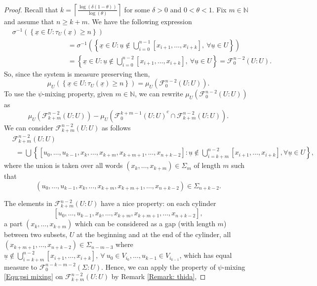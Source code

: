 \documentclass[11pt, reqno]{amsart}
\theoremstyle{plain}%
\theoremstyle{definition}
\theoremstyle{definition}
\def\N{\ensuremath{\mathbb N}}
\def\F{\ensuremath{\mathcal F}}
\def\ulx{\underline{x}}
\def\ulu{\underline{u}}
\numberwithin{equation}{section}
\begin{document}
\begin{proof}
Recall that $k=\left\lceil \frac{\log(\delta(1-\theta))}{\log(\theta)}\right\rceil$ for some $\delta>0$ and $0<\theta<1$. Fix $m\in \N $ and assume that $n\ge k+m$. We have the following expression
\begin{align*}
&\sigma^{-1}\left(\left\{\ulx\in U: \tau_U(\ulx)\ge n\right\}\right)\\&\quad\qquad\quad \qquad\qquad= \sigma^{-1}\left(\left\{ \ulx\in U: \ulu\notin \bigcup_{i=0}^{n-1} [x_{i+1},\ldots,x_{i+k}],\ \forall \ulu\in U \right\}\right) \\&\quad\qquad\quad \qquad\qquad= \left\{ \ulx\in U: \ulu\notin \bigcup_{i=0}^{n-2} [x_{i+1},\ldots,x_{i+k}],\ \forall \ulu\in U \right\} = \F_0^{n-2}(U:U).\end{align*} 
So, since the system is measure preserving then,
\begin{equation} 
\label{Eq: Same measure for sigma inverse}
\mu_U \left(\left\{\ulx\in U: \tau_U(\ulx)\ge n \right\}\right)=\mu_U\left(\F_0^{n-2}(U:U)\right). 
\end{equation}
To use the $\psi$-mixing property, given $m\in\N$, we can rewrite $\mu_U\left(\F_0^{n-2} (U:U)\right)$ as 
\begin{equation}
\mu_U\left(\F_{k+m}^{n-2}(U:U)\right)  -\mu_U\left( {\F_0^{k+m-1}(U:U)}^c\cap \F_{k+m}^{n-2}(U:U) \right).\label{Terms I&II}\end{equation}
We can consider $\F_{k+m}^{n-2}(U:U)$ as follows
\begin{align*}
    &\F_{k+m}^{n-2}(U:U)\\&\ \ = \bigcup\left\{[u_0,\ldots,u_{k-1},x_k,\ldots,x_{k+m},x_{k+m+1},\ldots,x_{n+k-2}]:\ulu\notin \bigcup_{i=k+m}^{n-2} [x_{i+1},\ldots,x_{i+k}], \forall \ulu\in U\right\},
\end{align*}
where the union is taken over all words $(x_k,\ldots,x_{k+m})\in\Sigma_m$ of length $m$ such that $$(u_0,\ldots,u_{k-1},x_k,\ldots,x_{k+m},x_{k+m+1},\ldots,x_{n+k-2})\in\Sigma_{n+k-2}.$$ 

The elements in ${\F_{k+m}^{n-2}(U:U)} $ have a nice property: on each cylinder $$[u_0,\ldots,u_{k-1},x_k,\ldots,x_{k+m},x_{k+m+1},\ldots,x_{n+k-2}],$$ a part $(x_k,\ldots,x_{k+m})$ which can be considered as a gap (with length $m$) between two subsets, $U$ at the beginning and at the end of the cylinder, all $(x_{k+m+1},\ldots,x_{n+k-2})\in \Sigma_{n-m-3}$ where $\ulu\notin \bigcup_{i=k+m}^{n-2} [x_{i+1},\ldots,x_{i+k}],\ \forall \ u_0\in V_{i_0},\ldots,u_{k-1}\in V_{i_{k-1}}$, which has equal measure to $\F_{0}^{n-k-m-2}(\Sigma:U)$. Hence, we can apply the property of $\psi$-mixing \eqref{Equ:psi mixing} on ${\F_{k+m}^{n-2}(U:U)} $ by Remark \ref{Remark: thida},



\end{proof}
\end{document}

